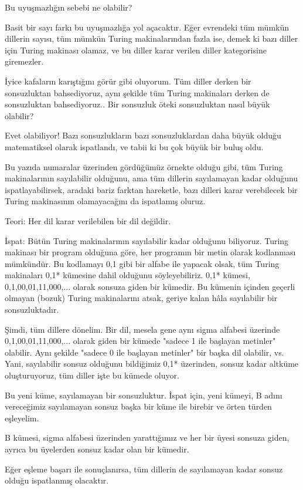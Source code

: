 \documentclass[12pt,fleqn]{article}\usepackage{../../common}
\begin{document}
Bu uyuşmazlığın sebebi ne olabilir? 

Basit bir sayı farkı bu uyuşmazlığa yol açacaktır. Eğer evrendeki tüm
mümkün dillerin sayısı, tüm mümkün Turing makinalarından fazla ise, demek
ki bazı diller için Turing makinası olamaz, ve bu diller karar verilen
diller kategorisine giremezler.

İyice kafaların karıştığını görür gibi oluyorum. Tüm diller derken bir
sonsuzluktan bahsediyoruz, aynı şekilde tüm Turing makinaları derken de
sonsuzluktan bahsediyoruz.. Bir sonsuzluk öteki sonsuzluktan nasıl büyük
olabilir?

Evet olabiliyor! Bazı sonsuzlukların bazı sonsuzluklardan daha büyük olduğu
matematiksel olarak ispatlandı, ve tabii ki bu çok büyük bir buluş oldu.

Bu yazıda numaralar üzerinden gördüğümüz örnekte olduğu gibi, tüm Turing
makinalarının sayılabilir olduğunu, ama tüm dillerin sayılamayan kadar
olduğunu ispatlayabilirsek, aradaki bariz farktan hareketle, bazı dilleri
karar verebilecek bir Turing makinasının olamayacağını da ispatlamış
oluruz.

Teori: Her dil karar verilebilen bir dil değildir.

İspat: Bütün Turing makinalarının sayılabilir kadar olduğunu
biliyoruz. Turing makinası bir program olduğuna göre, her programın bir
metin olarak kodlanması mümkündür. Bu kodlamayı {0,1} gibi bir alfabe ile
yapacak olsak, tüm Turing makinaları {0,1}* kümesine dahil olduğunu
söyleyebiliriz. {0,1}* kümesi, {0,1,00,01,11,000,...} olarak sonsuza giden
bir kümedir. Bu kümenin içinden geçerli olmayan (bozuk) Turing makinalarını
atsak, geriye kalan hâla sayılabilir bir sonsuzluktadır.

Şimdi, tüm dillere dönelim. Bir dil, mesela gene aynı sigma alfabesi
üzerinde {0,1,00,01,11,000,...} olarak giden bir kümede "sadece 1 ile
başlayan metinler" olabilir. Aynı şekilde "sadece 0 ile başlayan metinler"
bir başka dil olabilir, vs. Yani, sayılabilir sonsuz olduğunu bildiğimiz
{0,1}* üzerinden, sonsuz kadar altküme oluşturuyoruz, tüm diller işte bu
kümede oluyor.

Bu yeni küme, sayılamayan bir sonsuzluktur. İspat için, yeni kümeyi, B
adını vereceğimiz sayılamayan sonsuz başka bir küme ile birebir ve örten
türden eşleyelim.

B kümesi, sigma alfabesi üzerinden yarattığımız ve her bir üyesi sonsuza
giden, ayrıca bu üyelerden sonsuz kadar olan bir kümedir.

Eğer eşleme başarı ile sonuçlanırsa, tüm dillerin de sayılamayan kadar
sonsuz olduğu ispatlanmış olacaktır.
\end{document}
